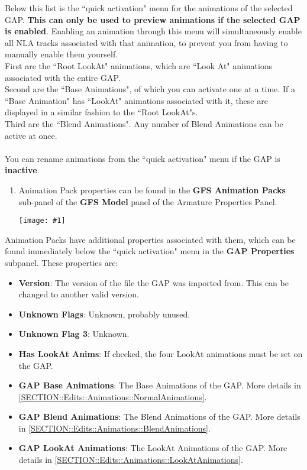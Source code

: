 \documentclass{article}
\newenvironment{guide}[1]
{
	\begin{center}
		\begin{tcolorbox}[%
			colback=black!20, 
			boxrule=0pt, 
			title=Step-by-step: #1,
			enhanced,
			breakable,
			overlay unbroken={%
                \draw[line width=1pt, black, rounded corners]
        	    (frame.north west) rectangle (frame.south east);
			},
    		overlay first={%
        		 \draw[line width=1pt, black, rounded corners]
        	    (frame.south west) -- (frame.north west) -- (frame.north east) -- (frame.south east);
                \draw[line width=1pt, black]
                (frame.south west) -- (frame.south east);
            },
    		overlay middle={%
                \draw[line width=1pt, black]
        	    (frame.north west) rectangle (frame.south east);
        	},
    		overlay last={%
                \draw[line width=1pt, black, rounded corners]
        	    (frame.north west) -- (frame.south west) -- (frame.south east) -- (frame.north east);
                \draw[line width=1pt, black]
                (frame.north west) -- (frame.north east);
           	}
        ]{}
    	\begin{enumerate}
}
{
    		\end{enumerate}
    	\end{tcolorbox}
	\end{center}  	 
}
\newcommand{\guideimage}[1]
{
	\begin{center}
		\texttt{[image: \#1]}
	\end{center}
}
\begin{document}
Below this list is the ``quick activation" menu for the animations of the selected GAP. \textbf{This can only be used to preview animations if the selected GAP is enabled}. Enabling an animation through this menu will simultaneously enable all NLA tracks associated with that animation, to prevent you from having to manually enable them yourself.\\
First are the ``Root LookAt" animations, which are ``Look At" animations associated with the entire GAP.\\
Second are the ``Base Animations", of which you can activate one at a time. If a ``Base Animation" has ``LookAt" animations associated with it, these are displayed in a similar fashion to the ``Root LookAt"s.\\
Third are the ``Blend Animations". Any number of Blend Animations can be active at once. \\\\
You can rename animations from the ``quick activation" menu if the GAP is \textbf{inactive}.

\begin{guide}{Accessing Animation Packs}
\item Animation Pack properties can be found in the \textbf{GFS Animation Packs} sub-panel of the \textbf{GFS Model} panel of the Armature Properties Panel.
\guideimage{images/editing_models/edits_animation_pack.png}
\end{guide}

Animation Packs have additional properties associated with them, which can be found immediately below the ``quick activation" menu in the \textbf{GAP Properties} subpanel. These properties are:
\begin{itemize}
\item \textbf{Version}: The version of the file the GAP was imported from. This can be changed to another valid version.
\item \textbf{Unknown Flags}: Unknown, probably unused.
\item \textbf{Unknown Flag 3}: Unknown.
\item \textbf{Has LookAt Anims}: If checked, the four LookAt animations must be set on the GAP.
\item \textbf{GAP Base Animations}: The Base Animations of the GAP. More details in \ref{SECTION::Edits::Animations::NormalAnimations}.
\item \textbf{GAP Blend Animations}: The Blend Animations of the GAP. More details in \ref{SECTION::Edits::Animations::BlendAnimations}.
\item \textbf{GAP LookAt Animations}: The LookAt Animations of the GAP. More details in \ref{SECTION::Edits::Animations::LookAtAnimations}.
\end{itemize}
\end{document}
